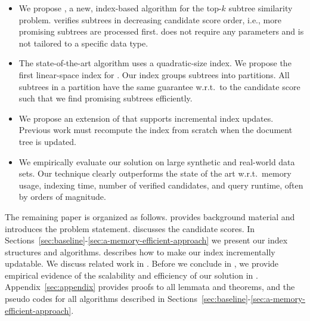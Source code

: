 \begin{itemize}
  \item We propose \shincone{}, a new, index-based algorithm for the top-$k$ subtree similarity problem. \shincone{} verifies subtrees in decreasing candidate score order, i.e., more promising subtrees are processed first. \shincone{} does not require any parameters and is not tailored to a specific data type.
  \item The state-of-the-art algorithm uses a quadratic-size index. We propose the first linear-space index for \tssqs{}. Our index groups subtrees into partitions. All subtrees in a partition have the same guarantee w.r.t.\ to the candidate score such that we find promising subtrees efficiently.
  \item We propose an extension of \shincone{} that supports incremental index updates. Previous work must recompute the index from scratch when the document tree is updated.
  \item We empirically evaluate our solution on large synthetic and real-world data sets. Our technique clearly outperforms the state of the art  w.r.t.\  memory usage, indexing time, number of verified candidates, and query runtime, often by orders of magnitude.
\end{itemize}

The remaining paper is organized as follows.  provides background material and introduces the problem statement.  discusses the candidate scores. In Sections~\ref{sec:baseline}-\ref{sec:a-memory-efficient-approach} we present our index structures and algorithms.  describes how to make our index incrementally updatable.
%
We discuss related work in . Before we conclude in , we provide empirical evidence of the scalability and efficiency of our solution in .
%
Appendix~\ref{sec:appendix} provides proofs to all lemmata and theorems, and the pseudo codes for all algorithms described in Sections~\ref{sec:baseline}-\ref{sec:a-memory-efficient-approach}.
